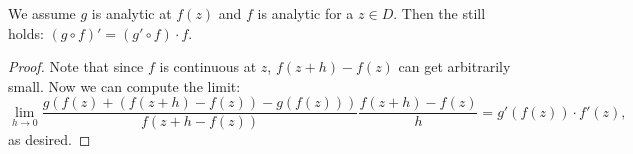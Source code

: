 \begin{theorem}
    We assume $g$ is analytic at $f(z)$ and $f$ is analytic for a $z \in D$.
    Then the  still holds: $(g \circ f)' = (g' \circ f) \cdot f$.
\end{theorem}

\begin{proof}
    Note that since $f$ is continuous at $z$, $f(z+h) - f(z)$ can get arbitrarily small.
    Now we can compute the limit:
    \[ \lim_{h \to 0} \frac{g(f(z) + (f(z+h) - f(z)) - g(f(z)))}{f(z+h - f(z))}
    \frac{f(z+h) - f(z)}{h} = g'(f(z)) \cdot f'(z), \]
    as desired.
\end{proof}






